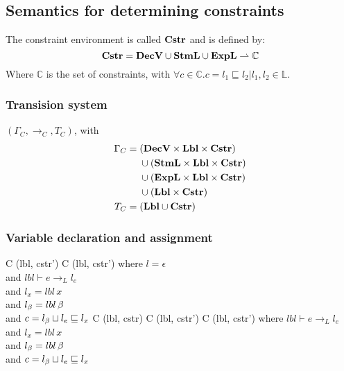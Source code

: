 \subsection{Semantics for determining constraints}
The constraint environment is called $\mathbf{Cstr}$ and is defined by:
\[
  \mathbf{Cstr} = \mathbf{DecV} \cup \mathbf{StmL} \cup \mathbf{ExpL} \rightharpoonup \mathbb{C}
\]
Where $\mathbb{C}$ is the set of constraints, with $\forall c \in \mathbb{C} . c = l_1 \sqsubseteq l_2 | l_1, l_2 \in \mathbb{L}$.

\subsubsection{Transision system}
$(\Gamma_{C}, \rightarrow_{C}, T_{C})$, with
\begin{align*}
  \Gamma_{C} =  & \;        (\mathbf{DecV} \times \mathbf{Lbl} \times \mathbf{Cstr}) \\
                & \;  \cup  (\mathbf{StmL} \times \mathbf{Lbl} \times \mathbf{Cstr}) \\
                & \;  \cup  (\mathbf{ExpL} \times \mathbf{Lbl} \times \mathbf{Cstr}) \\
                & \;  \cup  (\mathbf{Lbl} \times \mathbf{Cstr})               \\
  T_{C} =       & \;  (\mathbf{Lbl} \cup \mathbf{Cstr})
\end{align*}

\subsubsection{Variable declaration and assignment}

\begin{trules}
        { {C} {(lbl, cstr')} }
        { {C} {(lbl, cstr')} }
        {where $l = \epsilon$\\
          and $lbl \vdash e \rightarrow_L l_e$\\
          and $l_x = lbl \, x$\\
          and $l_\beta = lbl \, \beta$\\
          and $c = l_\beta \sqcup l_e \sqsubseteq l_x$}
        { {C} {(lbl, cstr)}}
        {}
        { {C} {(lbl, cstr')}}
        { {C} {(lbl, cstr')}}
        {where $lbl \vdash e \rightarrow_L l_e$\\
          and $l_x = lbl \, x$\\
          and $l_\beta = lbl \, \beta$\\
          and $c = l_\beta \sqcup l_e \sqsubseteq l_x$}
\end{trules}

